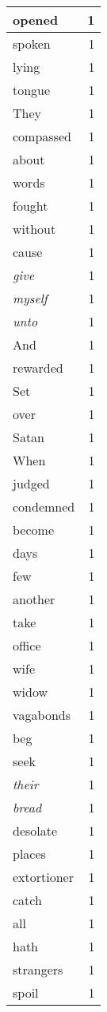 \begin{center}
\begin{longtable}{l|r}
opened & 1 \\ \hline
spoken & 1 \\ \hline
lying & 1 \\ \hline
tongue & 1 \\ \hline
They & 1 \\ \hline
compassed & 1 \\ \hline
about & 1 \\ \hline
words & 1 \\ \hline
fought & 1 \\ \hline
without & 1 \\ \hline
cause & 1 \\ \hline
\emph{give} & 1 \\ \hline
\emph{myself} & 1 \\ \hline
\emph{unto} & 1 \\ \hline
And & 1 \\ \hline
rewarded & 1 \\ \hline
Set & 1 \\ \hline
over & 1 \\ \hline
Satan & 1 \\ \hline
When & 1 \\ \hline
judged & 1 \\ \hline
condemned & 1 \\ \hline
become & 1 \\ \hline
days & 1 \\ \hline
few & 1 \\ \hline
another & 1 \\ \hline
take & 1 \\ \hline
office & 1 \\ \hline
wife & 1 \\ \hline
widow & 1 \\ \hline
vagabonds & 1 \\ \hline
beg & 1 \\ \hline
seek & 1 \\ \hline
\emph{their} & 1 \\ \hline
\emph{bread} & 1 \\ \hline
desolate & 1 \\ \hline
places & 1 \\ \hline
extortioner & 1 \\ \hline
catch & 1 \\ \hline
all & 1 \\ \hline
hath & 1 \\ \hline
strangers & 1 \\ \hline
spoil & 1 \\ \hline

\end{longtable}
\end{center}
